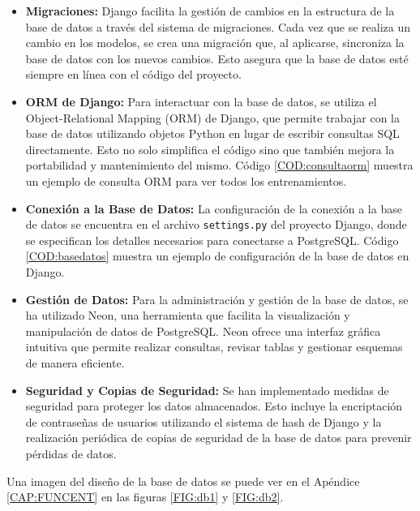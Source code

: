 \begin{itemize}
    \item \textbf{Migraciones:} Django facilita la gestión de cambios en la estructura de la base de datos a través del sistema de migraciones. Cada vez que se realiza un cambio en los modelos, se crea una migración que, al aplicarse, sincroniza la base de datos con los nuevos cambios. Esto asegura que la base de datos esté siempre en línea con el código del proyecto.

    \item \textbf{ORM de Django:} Para interactuar con la base de datos, se utiliza el Object-Relational Mapping (ORM) de Django, que permite trabajar con la base de datos utilizando objetos Python en lugar de escribir consultas SQL directamente. Esto no solo simplifica el código sino que también mejora la portabilidad y mantenimiento del mismo. Código \ref{COD:consultaorm} muestra un ejemplo de consulta ORM para ver todos los entrenamientos.

    \item \textbf{Conexión a la Base de Datos:} La configuración de la conexión a la base de datos se encuentra en el archivo \texttt{settings.py} del proyecto Django, donde se especifican los detalles necesarios para conectarse a PostgreSQL. Código \ref{COD:basedatos} muestra un ejemplo de configuración de la base de datos en Django.

    \item \textbf{Gestión de Datos:} Para la administración y gestión de la base de datos, se ha utilizado Neon, una herramienta que facilita la visualización y manipulación de datos de PostgreSQL. Neon ofrece una interfaz gráfica intuitiva que permite realizar consultas, revisar tablas y gestionar esquemas de manera eficiente.
    \item \textbf{Seguridad y Copias de Seguridad:} Se han implementado medidas de seguridad para proteger los datos almacenados. Esto incluye la encriptación de contraseñas de usuarios utilizando el sistema de hash de Django y la realización periódica de copias de seguridad de la base de datos para prevenir pérdidas de datos.
\end{itemize}

Una imagen del diseño de la base de datos se puede ver en el Apéndice \ref{CAP:FUNCENT} en las figuras \ref{FIG:db1} y \ref{FIG:db2}.